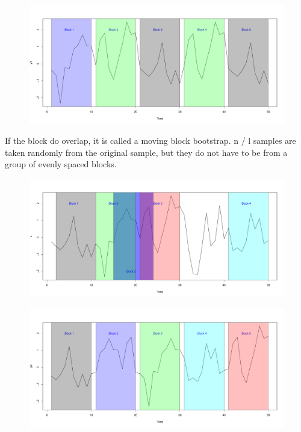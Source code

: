 \documentclass[12pt, letterpaper, titlepage]{article}
\begin{document}
\begin{figure}[h]
  \centering
  \includegraphics[width=\textwidth]{nm_ts}
  \caption{}
  \label{fig:nm_ts}
\end{figure}

If the block do overlap, it is called a moving block bootstrap. n / l samples are taken randomly from the original sample, but they do not have to be from a group of evenly spaced blocks.

\begin{figure}[h]
  \centering
  \includegraphics[width=\textwidth]{orig_ts_2}
  \caption{}
  \label{fig:orig_ts_2}
\end{figure}

\begin{figure}[h]
  \centering
  \includegraphics[width=\textwidth]{mv_ts}
  \caption{}
  \label{fig:mv_ts}
\end{figure}
\end{document}
